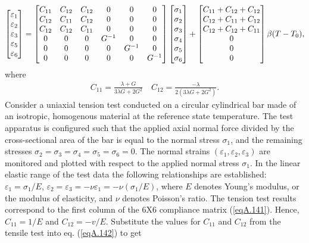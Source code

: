 \documentclass{AeroStructure-ERJohnson}
\begin{document}
\begin{align}\label{eqA.141}
\left[\begin{array}{@{}l@{}}\varepsilon_{1} \\\varepsilon_{2} \\\varepsilon_{3} \\\varepsilon_{5} \\\varepsilon_{6}\end{array}\right]=\left[\begin{array}{@{}cccccc@{}}C_{11} & C_{12} & C_{12} & 0 & 0 & 0 \\C_{12} & C_{11} & C_{12} & 0 & 0 & 0 \\C_{12} & C_{12} & C_{11} & 0 & 0 & 0 \\0 & 0 & 0 & G^{-1} & 0 & 0 \\0 & 0 & 0 & 0 & G^{-1} & 0 \\0 & 0 & 0 & 0 & 0 & G^{-1}\end{array}\right]\left[\begin{array}{@{}l@{}}\sigma_{1} \\\sigma_{2} \\\sigma_{3} \\\sigma_{4} \\\sigma_{5} \\\sigma_{6}\end{array}\right]+\left[\begin{array}{@{}c@{}}C_{11}+C_{12}+C_{12} \\C_{12}+C_{11}+C_{12} \\C_{12}+C_{12}+C_{11} \\0 \\0 \\0\end{array}\right] \beta(T-T_{0}),
\end{align}
\noindent where
\begin{align}\label{eqA.142}
C_{11}=\frac{\lambda+G}{3 \lambda G+2 G^{2}} \quad C_{12}=\frac{-\lambda}{2(3 \lambda G+2 G^{2})}.
\end{align}
Consider a uniaxial tension test conducted on a circular cylindrical bar made of an isotropic, homogenous material at the reference state temperature. The test apparatus is configured such that the applied axial normal force divided by the cross-sectional area of the bar is equal to the normal stress $\sigma_{1}$, and the remaining stresses $\sigma_{2}=\sigma_{3}=\sigma_{4}=\sigma_{5}=\sigma_{6}=0$. The normal strains $(\varepsilon_{1}, \varepsilon_{2}, \varepsilon_{3})$ are monitored and plotted with respect to the applied normal stress $\sigma_{1}$. In the linear elastic range of the test data the following relationships are established: $\varepsilon_{1}=\sigma_{1} / E$, $\varepsilon_{2}=\varepsilon_{3}=-\nu \varepsilon_{1}=-\nu(\sigma_{1} / E)$, where $E$ denotes Young’s modulus, or the modulus of elasticity, and $\nu$ denotes Poisson’s ratio. The tension test results correspond to the first column of the 6X6 compliance matrix (\ref{eqA.141}). Hence, $C_{11}=1 / E$ and $C_{12}=-v / E$. Substitute the values for $C_{11}$ and $C_{12}$ from the tensile test into eq. (\ref{eqA.142}) to get
\end{document}
